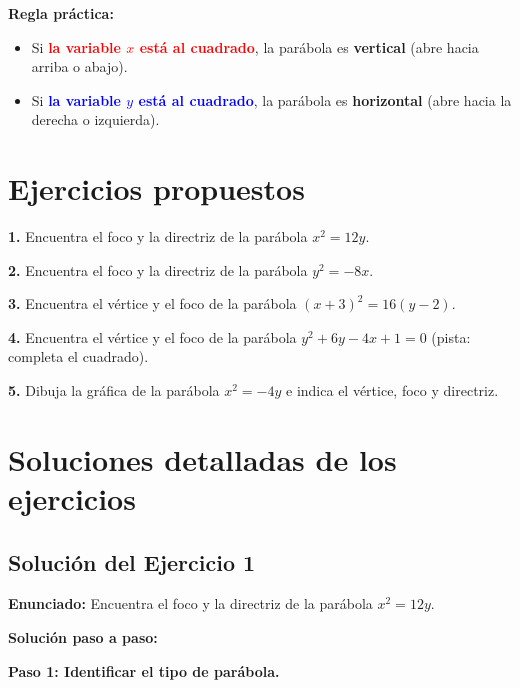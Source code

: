 \documentclass[12pt,a4paper]{article}
\begin{document}
	\bigskip

	\textbf{Regla práctica:}
	\begin{itemize}
		\item Si \textcolor{red}{\textbf{la variable \(x\) está al cuadrado}}, la parábola es \textbf{vertical} (abre hacia arriba o abajo).
		\item Si \textcolor{blue}{\textbf{la variable \(y\) está al cuadrado}}, la parábola es \textbf{horizontal} (abre hacia la derecha o izquierda).
	\end{itemize}

	\section{Ejercicios propuestos}

	\textbf{1.} Encuentra el foco y la directriz de la parábola \(x^2=12y\).

	\bigskip

	\textbf{2.} Encuentra el foco y la directriz de la parábola \(y^2=-8x\).

	\bigskip

	\textbf{3.} Encuentra el vértice y el foco de la parábola \((x+3)^2=16(y-2)\).

	\bigskip

	\textbf{4.} Encuentra el vértice y el foco de la parábola \(y^2+6y-4x+1=0\) (pista: completa el cuadrado).

	\bigskip

	\textbf{5.} Dibuja la gráfica de la parábola \(x^2=-4y\) e indica el vértice, foco y directriz.

	\bigskip
	\bigskip

	\section{Soluciones detalladas de los ejercicios}

	\subsection*{Solución del Ejercicio 1}

	\textbf{Enunciado:} Encuentra el foco y la directriz de la parábola \(x^2=12y\).

	\bigskip

	\textbf{Solución paso a paso:}

	\bigskip

	\textbf{Paso 1: Identificar el tipo de parábola.}
\end{document}
